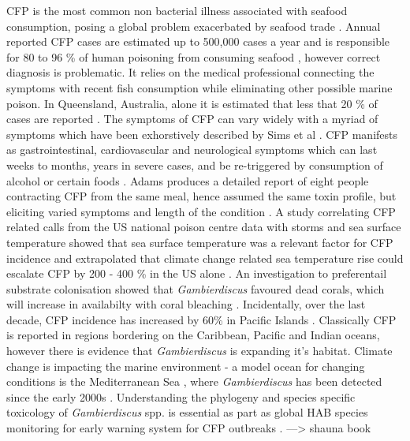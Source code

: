 \documentclass[12pt]{article}
\begin{document}
CFP is the most common non bacterial illness associated with seafood consumption, posing a global problem exacerbated by seafood trade \cite{friedman2008ciguatera}. %
Annual reported CFP cases are estimated up to 500,000 cases a year and is responsible for 80 to 96 \% of human poisoning from consuming seafood \cite{fleming1998seafood,grandjean2008centers}, however correct diagnosis is problematic. It relies on the medical professional connecting the symptoms with recent fish consumption while eliminating other possible marine poison. In Queensland, Australia, alone it is estimated that less that 20 \% of cases are reported \cite{lewis2006ciguatera}.
The symptoms of CFP can vary widely with a myriad of symptoms which have been exhorstively described by Sims et al \cite{sims1987theoretical}. CFP manifests as gastrointestinal, cardiovascular and neurological symptoms which can last weeks to months, years in severe cases, and be re-triggered by consumption of alcohol or certain foods \cite{lewis2006ciguatera}. Adams produces a detailed report of eight people contracting CFP from the same meal, hence assumed the same toxin profile, but eliciting varied symptoms and length of the condition \cite{adams1993outbreak}. 
A study correlating CFP related calls from the US national poison centre data with storms and sea surface temperature showed that sea surface temperature was a relevant factor for CFP incidence and extrapolated that climate change related sea temperature rise could escalate CFP by 200 - 400 \% in the US alone \cite{garces2012habitat}. An investigation to preferentail substrate colonisation showed that \emph{Gambierdiscus} favoured dead corals, which will increase in availabilty with coral bleaching \cite{grzebyk1994ecology}. Incidentally, over the last decade, CFP incidence has increased by 60\% in Pacific Islands \cite{skinner2011ciguatera}.
Classically CFP is reported in regions bordering on the Caribbean, Pacific and Indian oceans, however there is evidence that \emph{Gambierdiscus} is expanding it's habitat. Climate change is impacting the marine environment - a model ocean for changing conditions is the Mediterranean Sea \cite{lejeusne2010climate}, where \emph{Gambierdiscus} has been detected since the early 2000s \cite{aligizaki2008morphological}.
Understanding the phylogeny and species specific toxicology of \emph{Gambierdiscus} spp. is essential as part as global HAB species monitoring for early warning system for CFP outbreaks \cite{berdalet2012global}.
---> shauna book
\end{document}
